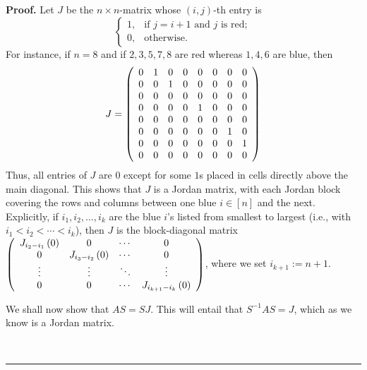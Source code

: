 \documentclass[numbers=enddot,12pt,final,onecolumn,notitlepage]{scrartcl}%
\numberwithin{exer}{subsection}
\theoremstyle{definition}
\newenvironment{proof}[1][Proof]{\noindent\textbf{#1.} }{\ \rule{0.5em}{0.5em}}
\begin{document}
\begin{proof}
Let $J$ be the $n\times n$-matrix whose $\left(  i,j\right)  $-th entry is%
\[%
\begin{cases}
1, & \text{if }j=i+1\text{ and }j\text{ is red};\\
0, & \text{otherwise.}%
\end{cases}
\]
For instance, if $n=8$ and if $2,3,5,7,8$ are red whereas $1,4,6$ are blue,
then%
\[
J=\left(
\begin{array}
[c]{cccccccc}%
0 & 1 & 0 & 0 & 0 & 0 & 0 & 0\\
0 & 0 & 1 & 0 & 0 & 0 & 0 & 0\\
0 & 0 & 0 & 0 & 0 & 0 & 0 & 0\\
0 & 0 & 0 & 0 & 1 & 0 & 0 & 0\\
0 & 0 & 0 & 0 & 0 & 0 & 0 & 0\\
0 & 0 & 0 & 0 & 0 & 0 & 1 & 0\\
0 & 0 & 0 & 0 & 0 & 0 & 0 & 1\\
0 & 0 & 0 & 0 & 0 & 0 & 0 & 0
\end{array}
\right)
\]
Thus, all entries of $J$ are $0$ except for some $1$s placed in cells directly
above the main diagonal. This shows that $J$ is a Jordan matrix, with each
Jordan block covering the rows and columns between one blue $i\in\left[
n\right]  $ and the next. Explicitly, if $i_{1},i_{2},\ldots,i_{k}$ are the
blue $i$'s listed from smallest to largest (i.e., with $i_{1}<i_{2}%
<\cdots<i_{k}$), then $J$ is the block-diagonal matrix $\left(
\begin{array}
[c]{cccc}%
J_{i_{2}-i_{1}}\left(  0\right)  & 0 & \cdots & 0\\
0 & J_{i_{3}-i_{2}}\left(  0\right)  & \cdots & 0\\
\vdots & \vdots & \ddots & \vdots\\
0 & 0 & \cdots & J_{i_{k+1}-i_{k}}\left(  0\right)
\end{array}
\right)  $, where we set $i_{k+1}:=n+1$.

We shall now show that $AS=SJ$. This will entail that $S^{-1}AS=J$, which as
we know is a Jordan matrix.


\end{proof}
\end{document}
